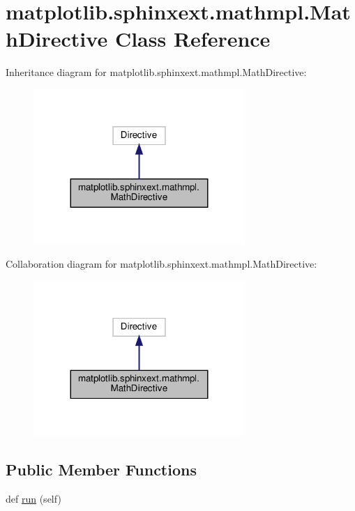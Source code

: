 \hypertarget{classmatplotlib_1_1sphinxext_1_1mathmpl_1_1MathDirective}{}\section{matplotlib.\+sphinxext.\+mathmpl.\+Math\+Directive Class Reference}
\label{classmatplotlib_1_1sphinxext_1_1mathmpl_1_1MathDirective}


Inheritance diagram for matplotlib.\+sphinxext.\+mathmpl.\+Math\+Directive\+:
\nopagebreak
\begin{figure}[H]
\begin{center}
\leavevmode
\includegraphics[width=227pt]{classmatplotlib_1_1sphinxext_1_1mathmpl_1_1MathDirective__inherit__graph}
\end{center}
\end{figure}


Collaboration diagram for matplotlib.\+sphinxext.\+mathmpl.\+Math\+Directive\+:
\nopagebreak
\begin{figure}[H]
\begin{center}
\leavevmode
\includegraphics[width=227pt]{classmatplotlib_1_1sphinxext_1_1mathmpl_1_1MathDirective__coll__graph}
\end{center}
\end{figure}
\subsection*{Public Member Functions}
\begin{DoxyCompactItemize}
\item 
def \hyperlink{classmatplotlib_1_1sphinxext_1_1mathmpl_1_1MathDirective_aa48fd39c0556c1bbe0ecaccba2c06ad4}{run} (self)
\end{DoxyCompactItemize}
